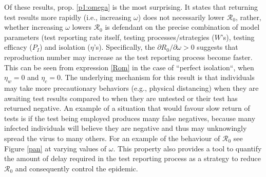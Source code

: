 \documentclass[12pt]{article}
\newcommand{\Rnum}{\mathcal{R}_0}
\theoremstyle{definition} %
\begin{document}
 Of these results, prop. \ref{p1:omega} is the most surprising. It states that returning test results more rapidly (i.e., increasing $\omega$) does not necessarily lower $\Rnum$, rather, whether increasing $\omega$ lowers $\Rnum$ is defendant on the precise combination of model parameters (test reporting rate itself, testing processes/strategies ($W$'s), testing efficacy ($P_I$) and isolation ($\eta$'s). Specifically, the $\partial{R_0}/\partial{\omega}>0$ suggests that reproduction number may increase as the test reporting process become faster. This can be seen from expression \eqref{Rom} in the case of ``perfect isolation``, when $\eta_w=0$ and $\eta_c=0$. The underlying mechanism for this result is that individuals may take more precautionary behaviors (e.g., physical distancing) when they are awaiting test results compared to when they are untested or their test has returned negative. An example of a situation that would favour slow return of tests is if the test being employed produces many false negatives, because many infected individuals will believe they are negative and thus may unknowingly spread the virus to many others.  For an example of the behaviour of $\Rnum$ see Figure \ref{pan} at varying values of $\omega$. This property also provides a tool to quantify the amount of delay required in the test reporting process as a strategy to reduce $\Rnum$ and consequently control the epidemic.   
\end{document}

